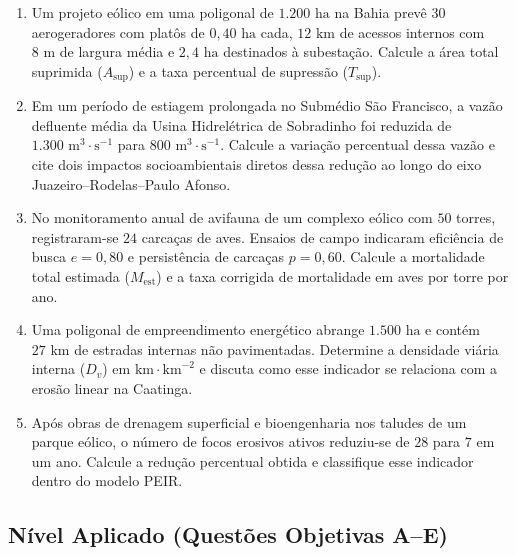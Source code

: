 \begin{enumerate}[leftmargin=1.8em, itemsep=6pt, resume]
  \item Um projeto eólico em uma poligonal de $1.200\text{ ha}$ na Bahia prevê $30$ aerogeradores com platôs de $0{,}40\text{ ha}$ cada, $12\text{ km}$ de acessos internos com $8\text{ m}$ de largura média e $2{,}4\text{ ha}$ destinados à subestação. Calcule a área total suprimida ($A_{\text{sup}}$) e a taxa percentual de supressão ($T_{\text{sup}}$).
  \espacoResolucao[2.2cm]

  \item Em um período de estiagem prolongada no Submédio São Francisco, a vazão defluente média da Usina Hidrelétrica de Sobradinho foi reduzida de $1.300\text{ m}^3\cdot\text{s}^{-1}$ para $800\text{ m}^3\cdot\text{s}^{-1}$. Calcule a variação percentual dessa vazão e cite dois impactos socioambientais diretos dessa redução ao longo do eixo Juazeiro--Rodelas--Paulo Afonso.
  \espacoResolucao[2.2cm]

  \item No monitoramento anual de avifauna de um complexo eólico com $50$ torres, registraram-se $24$ carcaças de aves. Ensaios de campo indicaram eficiência de busca $e = 0{,}80$ e persistência de carcaças $p = 0{,}60$. Calcule a mortalidade total estimada ($M_{\text{est}}$) e a taxa corrigida de mortalidade em aves por torre por ano.
  \espacoResolucao[2.2cm]

  \item Uma poligonal de empreendimento energético abrange $1.500\text{ ha}$ e contém $27\text{ km}$ de estradas internas não pavimentadas. Determine a densidade viária interna ($D_v$) em $\text{km}\cdot\text{km}^{-2}$ e discuta como esse indicador se relaciona com a erosão linear na Caatinga.
  \espacoResolucao[2.0cm]

  \item Após obras de drenagem superficial e bioengenharia nos taludes de um parque eólico, o número de focos erosivos ativos reduziu-se de $28$ para $7$ em um ano. Calcule a redução percentual obtida e classifique esse indicador dentro do modelo PEIR.
  \espacoResolucao[2.0cm]
\end{enumerate}

\subsection*{Nível Aplicado (Questões Objetivas A--E)}

